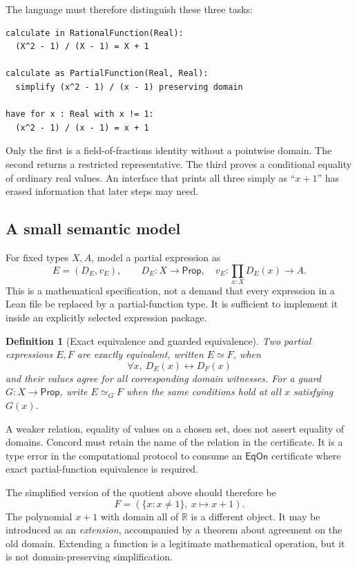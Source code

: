 \documentclass[11pt,a4paper]{article}
\newcommand{\R}{\mathbb R}
\newcommand{\EqOn}{\mathsf{EqOn}}
\newtheorem{definition}[proposition]{Definition}
\theoremstyle{remark}
\begin{document}
The language must therefore distinguish these three tasks:
\par\smallskip\noindent\begin{minipage}{\linewidth}
\begin{lstlisting}
calculate in RationalFunction(Real):
  (X^2 - 1) / (X - 1) = X + 1

calculate as PartialFunction(Real, Real):
  simplify (x^2 - 1) / (x - 1) preserving domain

have for x : Real with x != 1:
  (x^2 - 1) / (x - 1) = x + 1
\end{lstlisting}
\end{minipage}\par\smallskip
Only the first is a field-of-fractions identity without a pointwise domain.
The second returns a restricted representative. The third proves a conditional
equality of ordinary real values. An interface that prints all three simply as
``$x+1$'' has erased information that later steps may need.

\subsection{A small semantic model}
For fixed types $X,A$, model a partial expression as
\[
 E=(D_E,v_E),\qquad
 D_E:X\to\mathsf{Prop},\quad
 v_E:\prod_{x:X}D_E(x)\to A.
\]
This is a mathematical specification, not a demand that every expression in a
Lean file be replaced by a partial-function type. It is sufficient to implement
it inside an explicitly selected expression package.

\begin{definition}[Exact equivalence and guarded equivalence]
Two partial expressions $E,F$ are exactly equivalent, written $E\simeq F$, when
\[
 \forall x,\ D_E(x)\leftrightarrow D_F(x)
\]
and their values agree for all corresponding domain witnesses. For a guard
$G:X\to\mathsf{Prop}$, write $E\simeq_G F$ when the same conditions hold at
all $x$ satisfying $G(x)$.
\end{definition}

A weaker relation, equality of values on a chosen set, does not assert equality
of domains. Concord must retain the name of the relation in the certificate.
It is a type error in the computational protocol to consume an
$\EqOn$ certificate where exact partial-function equivalence is required.

The simplified version of the quotient above should therefore be
\[
 F=(\{x:x\ne1\},\ x\mapsto x+1).
\]
The polynomial $x+1$ with domain all of $\R$ is a different object. It may be
introduced as an \emph{extension}, accompanied by a theorem about agreement on
the old domain. Extending a function is a legitimate mathematical operation,
but it is not domain-preserving simplification.
\end{document}
